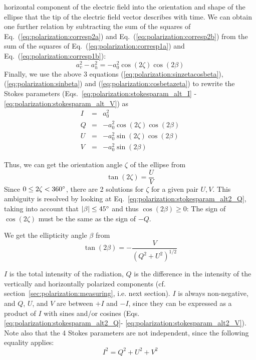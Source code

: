 horizontal component of the electric field into the orientation and
shape of the ellipse that the tip of the electric field vector describes with
time.  We can obtain one further relation by subtracting the sum of
the squares of Eq.~(\ref{eq:polarization:corresp2a}) and
Eq.~(\ref{eq:polarization:corresp2b}) from the sum of the squares of
Eq.~(\ref{eq:polarization:corresp1a}) and
Eq.~(\ref{eq:polarization:corresp1b}):
\begin{equation}
  \label{eq:polarization:cosbetazeta}
 a_v^2 - a_h^2 =  -a_0^2 \cos(2\zeta)\cos(2\beta)
\end{equation}
Finally, we use the above 3 equations
(\ref{eq:polarization:sinzetacosbeta}), 
(\ref{eq:polarization:sinbeta}) and 
(\ref{eq:polarization:cosbetazeta}) to rewrite the Stokes parameters
(Eqs.~\ref{eq:polarization:stokesparam_alt_I}%
-\ref{eq:polarization:stokesparam_alt_V}) 
as
\begin{eqnarray}
  \label{eq:polarization:stokesparam_alt2_I}
 I &=& a_0^2\\
  \label{eq:polarization:stokesparam_alt2_Q}
 Q &=&  -a_0^2 \cos(2\zeta)\cos(2\beta)\\ 
  \label{eq:polarization:stokesparam_alt2_U}
 U &=& -a_0^2 \sin(2\zeta)\cos(2\beta)\\
  \label{eq:polarization:stokesparam_alt2_V}
 V &=& -a_0^2 \sin(2\beta)
\end{eqnarray}

Thus, we can get the orientation angle $\zeta$ of the ellipse from
\begin{equation}
  \label{eq:polarization:tan2zeta}
 \tan(2\zeta) = \frac{U}{V}
\end{equation}
Since $0 \leq 2\zeta < 360^\circ$, there are 2 solutions for $\zeta$ for a
given pair $U,V$. This ambiguity is resolved by looking at
Eq.~\ref{eq:polarization:stokesparam_alt2_Q}, taking into account that
$|\beta| \leq 45^\circ$ and thus $\cos(2\beta) \geq 0$:
The sign of $\cos(2\zeta)$ must be the same as the sign of $-Q$.

We get the ellipticity angle $\beta$  from
\begin{equation}
  \label{eq:polarization:tan2beta}
 \tan(2\beta) = - \frac{V}{(Q^2 + U^2)^{1/2}}  
\end{equation}

$I$ is the total intensity of the radiation, 
$Q$ is the difference in the intensity of the vertically and
horizontally polarized components
(cf. section~\ref{sec:polarization:measuring}, i.e. next section).
$I$ is always non-negative, and $Q$, $U$, and $V$ are between $+I$ and $-I$,
since they can be expressed as a product of $I$ with sines and/or
cosines
(Eqs. \ref{eq:polarization:stokesparam_alt2_Q}-%
\ref{eq:polarization:stokesparam_alt2_V}). 
Note also that the 4 Stokes parameters are not independent, since the
following equality applies:
\begin{equation}
  \label{eq:polarization:Isquare}
  I^2 = Q^2 + U^2 + V^2
\end{equation}

